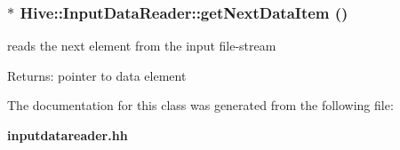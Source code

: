 \subsubsection[getNextDataItem]{$\ast$ Hive::InputDataReader::getNextDataItem ()\hspace{0.3cm}{\tt  [protected]}}\label{classHive_1_1InputDataReader_f35864f9ba42c078b0d4fc033c64a30a}


reads the next element from the input file-stream \begin{Desc}
\item[Returns:]pointer to data element \end{Desc}


The documentation for this class was generated from the following file:\begin{CompactItemize}
\item 
{\bf inputdatareader.hh}\end{CompactItemize}
